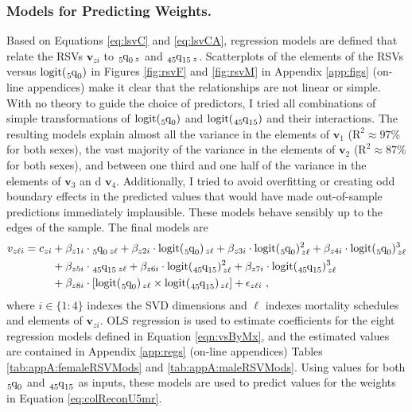 \documentclass[11pt]{article}
\newcommand{\mbf}{\mathbf}
\newcommand{\qf}{\tensor*[_5]{\mbox{q}}{_0}}
\newcommand{\qff}{\tensor*[_{45}]{\mbox{q}}{_{15}}}
\newcommand{\logit}{\mbox{logit}}
\begin{document}
\subsubsection{Models for Predicting Weights. \label{sec:modsPredWeights}} 

Based on Equations \ref{eq:lsvC} and \ref{eq:lsvCA}, regression models are defined that relate the RSVs $\mbf{v}_{zi}$ to $\qf_{\, z}$ and $\qff_{\, z}$.  Scatterplots of the elements of the RSVs versus $\logit(\qf)$ in Figures \ref{fig:rsvF} and \ref{fig:rsvM} in Appendix \ref{app:figs} (on-line appendices) make it clear that the relationships are not linear or simple.  With no theory to guide the choice of predictors, I tried all combinations of simple transformations of $\logit(\qf)$ and $\logit(\qff)$ and their interactions.  The resulting models explain almost all the variance in the elements of $\mbf{v}_1$ ($\mbox{R}^2 \approx 97\%$ for both sexes), the vast majority of the variance in the elements of $\mbf{v}_2$ ($\mbox{R}^2 \approx 87\%$ for both sexes), and between one third and one half of the variance in the elements of $\mbf{v}_3$ an d $\mbf{v}_4$.  Additionally, I tried to avoid overfitting or creating odd boundary effects in the predicted values that would have made out-of-sample predictions immediately implausible.  These models behave sensibly up to the edges of the sample. The final models are %
%
\begin{align}
v_{z \ell i} = c_{zi} &+  \beta_{z1i} \cdot \qf_{\, z\ell} + \beta_{z2i} \cdot \logit(\qf)_{\, z\ell} + \beta_{z3i} \cdot \logit(\qf)^2_{\, z\ell} + \beta_{z4i} \cdot \logit(\qf)^3_{\, z\ell} \nonumber \\  
 &+ \beta_{z5i} \cdot \qff_{\, z\ell} + \beta_{z6i} \cdot \logit(\qff)^2_{\, z\ell} +  \beta_{z7i} \cdot \logit(\qff)^3_{\, z\ell} \nonumber \\ 
 &+ \beta_{z8i} \cdot [\logit(\qf)_{\, z\ell} \times \logit(\qff)_{\, z\ell}] + \epsilon_{z\ell i} \ , \label{eqn:vsByMx} 
\end{align}%
%
where $i \in \{1:4\}$ indexes the SVD dimensions and $\ell$ indexes mortality schedules and elements of $\mbf{v}_{zi}$.  OLS regression is used to estimate coefficients for the eight regression models defined in Equation \ref{eqn:vsByMx}, and the estimated values are contained in Appendix \ref{app:regs} (on-line appendices) Tables \ref{tab:appA:femaleRSVMods} and \ref{tab:appA:maleRSVMods}.  Using  values for both $\qf$ and $\qff$ as inputs, these models are used to predict values for the weights in Equation \ref{eq:colReconU5mr}.  
\end{document}
